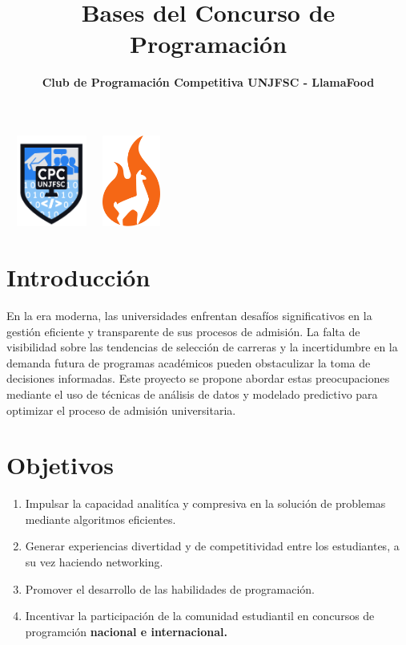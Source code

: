 \documentclass{article}
\date{}
\title{Bases del Concurso de Programación}
\author{\textbf{Club de Programación Competitiva UNJFSC - LlamaFood}}
\begin{document}
\maketitle
\begin{center}
    \includegraphics[width=3cm, height=3cm]{images/logo-club.png}
    \includegraphics[width=2cm, height=3cm]{images/llamafood.png}
\end{center}
\section{Introducción}

En la era moderna, las universidades enfrentan desafíos significativos en la gestión eficiente y transparente de sus procesos de admisión. La falta de visibilidad sobre las tendencias de selección de carreras y la incertidumbre en la demanda futura de programas académicos pueden obstaculizar la toma de decisiones informadas. Este proyecto se propone abordar estas preocupaciones mediante el uso de técnicas de análisis de datos y modelado predictivo para optimizar el proceso de admisión universitaria.


\section{Objetivos}
\begin{enumerate}
    \item Impulsar la capacidad analitíca y compresiva en la solución de problemas mediante algoritmos eficientes.
    \item Generar experiencias divertidad y de competitividad entre los estudiantes, a su vez haciendo networking.
    \item Promover el desarrollo de las habilidades de programación.
    \item Incentivar la participación de la comunidad estudiantil en concursos de programción \textbf{nacional e internacional.}
\end{enumerate}
\end{document}
